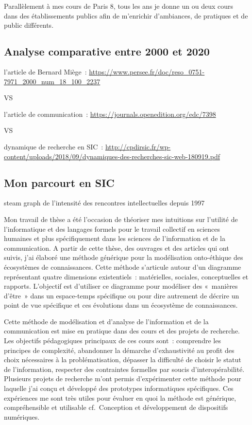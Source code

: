 \documentclass[
  letterpaper,
  DIV=11,
  numbers=noendperiod]{scrreprt}
\begin{document}
Parallèlement à mes cours de Paris 8, tous les ans je donne un ou deux
cours dans des établissements publics afin de m'enrichir d'ambiances, de
pratiques et de public différents.

\hypertarget{analyse-comparative-entre-2000-et-2020}{%
\subsection{Analyse comparative entre 2000 et
2020}\label{analyse-comparative-entre-2000-et-2020}}

l'article de Bernard Miège~:
\url{https://www.persee.fr/doc/reso_0751-7971_2000_num_18_100_2237}

VS

l'article de communication~:
\url{https://journals.openedition.org/edc/7398}

VS

dynamique de recherche en SIC~:
\url{http://cpdirsic.fr/wp-content/uploads/2018/09/dynamiques-des-recherches-sic-web-180919.pdf}

\hypertarget{mon-parcourt-en-sic}{%
\subsection{Mon parcourt en SIC}\label{mon-parcourt-en-sic}}

steam graph de l'intensité des rencontres intellectuelles depuis 1997

Mon travail de thèse a été l'occasion de théoriser mes intuitions sur
l'utilité de l'informatique et des langages formels pour le travail
collectif en sciences humaines et plus spécifiquement dans les sciences
de l'information et de la communication. A partir de cette thèse, des
ouvrages et des articles qui ont suivis, j'ai élaboré une méthode
générique pour la modélisation onto-éthique des écosystèmes de
connaissances. Cette méthode s'articule autour d'un diagramme
représentant quatre dimensions existentiels~: matérielles, sociales,
conceptuelles et rapports. L'objectif est d'utiliser ce diagramme pour
modéliser des «~manières d'être~» dans un espace-temps spécifique ou
pour dire autrement de décrire un point de vue spécifique et ces
évolutions dans un écosystème de connaissances.

Cette méthode de modélisation et d'analyse de l'information et de la
communication est mise en pratique dans des cours et des projets de
recherche. Les objectifs pédagogiques principaux de ces cours sont~:
comprendre les principes de complexité, abandonner la démarche
d'exhaustivité au profit des choix nécessaires à la problématisation,
dépasser la difficulté de choisir le statut de l'information, respecter
des contraintes formelles par soucis d'interopérabilité. Plusieurs
projets de recherche m'ont permis d'expérimenter cette méthode pour
laquelle j'ai conçu et développé des prototypes informatiques
spécifiques. Ces expériences me sont très utiles pour évaluer en quoi la
méthode est générique, compréhensible et utilisable cf.~Conception et
développement de dispositifs numériques.
\end{document}
